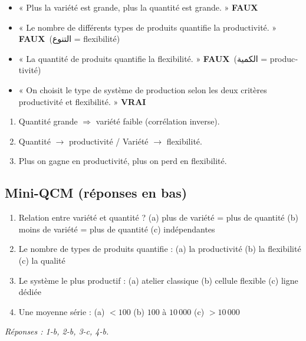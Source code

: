 \documentclass[11pt,a4paper]{article}
\newcommand{\ar}[1]{\textarabic{#1}}
\newcommand{\vrai}{\textcolor{vert}{\textbf{VRAI}}}
\newcommand{\faux}{\textcolor{rouge}{\textbf{FAUX}}}
\begin{document}
\begin{piege}
\begin{itemize}
\item « Plus la variété est grande, plus la quantité est grande. » \faux
\item « Le nombre de différents types de produits quantifie la productivité. » \faux\ \ar{(التنوع = \textfrench{flexibilité})}
\item « La quantité de produits quantifie la flexibilité. » \faux\ \ar{(الكمية = \textfrench{productivité})}
\item « On choisit le type de système de production selon les deux critères productivité et flexibilité. » \vrai
\end{itemize}
\end{piege}

\begin{resume}
\begin{enumerate}
\item Quantité grande $\Rightarrow$ variété faible (corrélation inverse).
\item Quantité $\rightarrow$ productivité \quad / \quad Variété $\rightarrow$ flexibilité.
\item Plus on gagne en productivité, plus on perd en flexibilité.
\end{enumerate}
\end{resume}

\subsection*{Mini-QCM (réponses en bas)}
\begin{enumerate}
\item Relation entre variété et quantité ? \quad (a) plus de variété = plus de quantité \quad (b) moins de variété = plus de quantité \quad (c) indépendantes
\item Le nombre de types de produits quantifie : \quad (a) la productivité \quad (b) la flexibilité \quad (c) la qualité
\item Le système le plus productif : \quad (a) atelier classique \quad (b) cellule flexible \quad (c) ligne dédiée
\item Une moyenne série : \quad (a) $<100$ \quad (b) $100$ à $10\,000$ \quad (c) $>10\,000$
\end{enumerate}
{\small\textit{Réponses : 1-b, 2-b, 3-c, 4-b.}}
\end{document}
